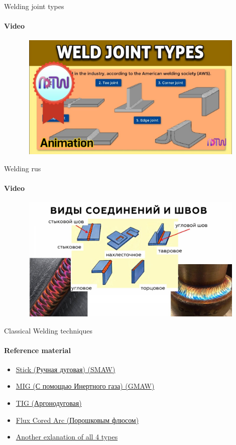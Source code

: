 \documentclass[aspectratio=169]{beamer}
\begin{document}
\begin{frame}[t]{Welding joint types}
    \framesubtitle{Video}
    \vspace{-0.6cm}
    \begin{figure}[H]
        \href{https://youtu.be/8kbUZLuhrW8}{
            \centering\includegraphics[height=6cm,width=1\textwidth,keepaspectratio]{weld_joint_types_video.jpg}}
        \label{fig:weld_joint_types_video.jpg}
    \end{figure}
\end{frame}

\begin{frame}[t]{Welding rus}
    \framesubtitle{Video}
    \vspace{-0.6cm}
    \begin{figure}[H]
        \href{https://youtu.be/bCe_WB7vO-A}{
            \centering\includegraphics[height=6cm,width=1\textwidth,keepaspectratio]{welding_rus_video.jpg}}
        \label{fig:welding_rus_video.jpg}
    \end{figure}
\end{frame}

\begin{frame}[t]{Classical Welding techniques}
    \framesubtitle{Reference material}
    \begin{itemize}
        \item \href{https://www.youtube.com/watch?v=elmDvqdeMKI}{Stick (Ручная дуговая) (SMAW)}
        \item \href{https://youtu.be/twUAa5LWUvk}{MIG (С помощью Инертного газа) (GMAW)}
        \item \href{https://youtu.be/uO5pVLOAmD4}{TIG (Аргонодуговая)}
        \item \href{https://www.youtube.com/watch?v=TPSQJXqSwTg}{Flux Cored Arc (Порошковым флюсом)}
        \item \href{https://youtu.be/y-OKi8oSNQ4}{Another exlanation of all 4 types}
    \end{itemize}
\end{frame}
\end{document}
